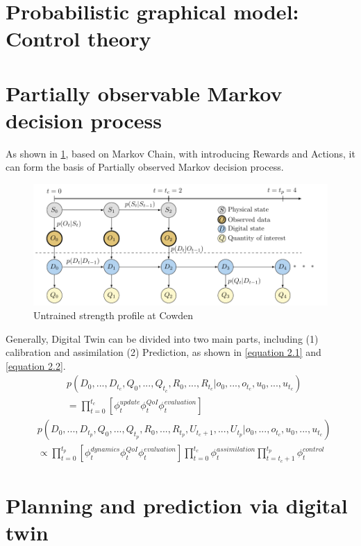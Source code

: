 \section{Probabilistic graphical model: Control theory }




\section{Partially observable Markov decision process}

As shown in \cref{fig:fig-POMDP}, based on Markov Chain, with introducing Rewards and Actions, it can form the basis of Partially observed Markov decision process.
\begin{figure}[htbp]
    \centering
    \includegraphics[width = 150mm]{Figures/figure-POMDP.pdf}
    \caption{Untrained strength profile at Cowden \protect\cite{kapteyn2021}}
    \label{fig:fig-POMDP}
\end{figure}
Generally, Digital Twin can be divided into two main parts, including (1) calibration and assimilation (2) Prediction, as shown in \cref{equation 2.1}  and \cref{equation 2.2}.
\setlength\abovedisplayskip{2pt}
\setlength\belowdisplayskip{2pt}
\begin{equation}
\begin{aligned}
& p(D_{0},...,D_{t_{c}},Q_{0},...,Q_{t_{c}},R_{0},...,R_{t_{c}}|o_{0},...,o_{t_{c}},u_{0},...,u_{t_{c}}) \\
& = \prod_{t=0}^{t_{c}}[\phi_{t}^{update}\phi_{t}^{QoI}\phi_{t}^{evaluation}] \label{equation 2.1}
\end{aligned}
\end{equation}
\setlength\abovedisplayskip{2pt}
\setlength\belowdisplayskip{2pt}
\begin{equation}
\begin{aligned}
    & p(D_{0},...,D_{t_{p}},Q_{0},...,Q_{t_{p}},R_{0},...,R_{t_{p}},U_{t_{c}+1},...,U_{t_{p}}|o_{0},...,o_{t_{c}},u_{0},...,u_{t_{c}}) \\
    & \propto \prod_{t=0}^{t_{p}}[\phi_{t}^{dynamics}\phi_{t}^{QoI}\phi_{t}^{evaluation}] \prod_{t=0}^{t_{c}}\phi_{t}^{assimilation} \prod_{t=t_{c}+1}^{t_{p}}\phi_{t}^{control} \label{equation 2.2}
\end{aligned}
\end{equation}




\section{Planning and prediction via digital twin}